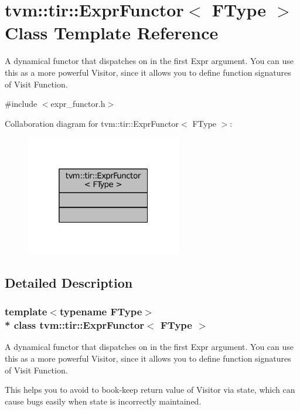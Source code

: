 \hypertarget{classtvm_1_1tir_1_1ExprFunctor}{}\section{tvm\+:\+:tir\+:\+:Expr\+Functor$<$ F\+Type $>$ Class Template Reference}
\label{classtvm_1_1tir_1_1ExprFunctor}


A dynamical functor that dispatches on in the first Expr argument. You can use this as a more powerful Visitor, since it allows you to define function signatures of Visit Function.  




{\ttfamily \#include $<$expr\+\_\+functor.\+h$>$}



Collaboration diagram for tvm\+:\+:tir\+:\+:Expr\+Functor$<$ F\+Type $>$\+:
\nopagebreak
\begin{figure}[H]
\begin{center}
\leavevmode
\includegraphics[width=193pt]{classtvm_1_1tir_1_1ExprFunctor__coll__graph}
\end{center}
\end{figure}


\subsection{Detailed Description}
\subsubsection*{template$<$typename F\+Type$>$\\*
class tvm\+::tir\+::\+Expr\+Functor$<$ F\+Type $>$}

A dynamical functor that dispatches on in the first Expr argument. You can use this as a more powerful Visitor, since it allows you to define function signatures of Visit Function. 

This helps you to avoid to book-\/keep return value of Visitor via state, which can cause bugs easily when state is incorrectly maintained.



